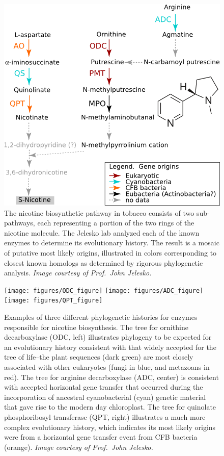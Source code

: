 \documentclass[11pt,letterpaper,twoside,english]{article}
\begin{document}
\begin{figure}[htbp]
    \begin{center}
        \includegraphics[width=.6\linewidth]{figures/pyridine_alkaloid_biosynthesis}
    \end{center}
    \caption{The nicotine biosynthetic pathway in tobacco consists of two
    sub-pathways, each representing a portion of the two rings of the nicotine
    molecule. The Jelesko lab analyzed each of the known enzymes to determine
    its evolutionary history. The result is a mosaic of putative most likely
    origins, illustrated in colors corresponding to closest known homologs as
    determined by rigorous phylogenetic analysis. \textit{Image courtesy of
    Prof.~John Jelesko.}}
    \label{fig:nicotine}
\end{figure}

\begin{figure}[htbp]
    \begin{center}
        \texttt{[image: figures/ODC\_figure]}
        \texttt{[image: figures/ADC\_figure]}
        \texttt{[image: figures/QPT\_figure]}
    \end{center}
    \caption{Examples of three different phylogenetic histories for enzymes
    responsible for nicotine biosynthesis. The tree for ornithine
    decarboxylase (ODC, left) illustrates phylogeny to be expected for an
    evolutionary history consistent with that widely accepted for the tree of
    life--the plant sequences (dark green) are most closely associated with
    other eukaryotes (fungi in blue, and metazoans in red). The tree for
    arginine decarboxylase (ADC, center) is consistent with accepted
    horizontal gene transfer that occurred during the incorporation of
    ancestral cyanobacterial (cyan) genetic material that gave rise to the
    modern day chloroplast. The tree for quinolate phosphoribosyl transferase
    (QPT, right) illustrates a much more complex evolutionary history, which
    indicates its most likely origins were from a horizontal gene transfer
    event from CFB bacteria (orange). \textit{Image courtesy of Prof.~John
    Jelesko.}}
    \label{fig:phylo_histories}
\end{figure}
\end{document}
